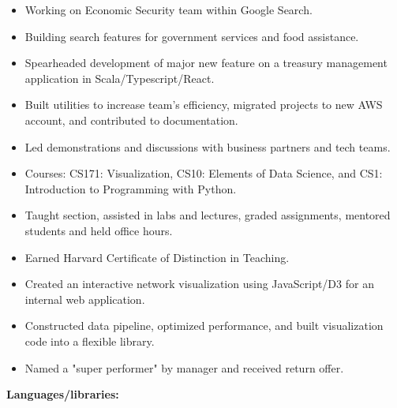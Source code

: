 \documentclass[10pt,a4paper]{altacv}
\begin{document}
\begin{fullwidth}
\begin{itemize}
\item Working on Economic Security team within Google Search.
\item Building search features for government services and food assistance. 
\end{itemize}
\vspace{6pt}
\begin{itemize}
\item Spearheaded development of major new feature on a treasury management application in Scala/Typescript/React.
\item Built utilities to increase team's efficiency, migrated projects to new AWS account, and contributed to documentation.
\item Led demonstrations and discussions with business partners and tech teams. 
\end{itemize}
\vspace{6pt}
\begin{itemize}
\item Courses: CS171: Visualization, CS10: Elements of Data Science, and CS1: Introduction to Programming with Python.
\item Taught section, assisted in labs and lectures, graded assignments, mentored students and held office hours. 
\item Earned Harvard Certificate of Distinction in Teaching. 
\end{itemize}
\vspace{6pt}
\begin{itemize}
\item Created an interactive network visualization using JavaScript/D3 for an internal web application. 
\item Constructed data pipeline, optimized performance, and built visualization code into a flexible library. 
\item Named a "super performer" by manager and received return offer.
\end{itemize}
\vspace{6pt}
\textbf{\color{accent}Languages/libraries:}
\vspace{3pt}


\end{fullwidth}
\end{document}
